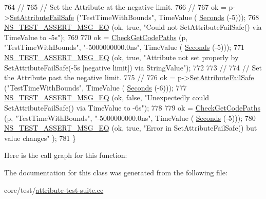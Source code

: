 \begin{DoxyCode}
764   \textcolor{comment}{//}
765   \textcolor{comment}{// Set the Attribute at the negative limit.}
766   \textcolor{comment}{//}
767   ok = p->\hyperlink{classns3_1_1ObjectBase_aa7d333004e970f925a4ed5df275541b5}{SetAttributeFailSafe} (\textcolor{stringliteral}{"TestTimeWithBounds"}, TimeValue (
      \hyperlink{group__timecivil_ga33c34b816f8ff6628e33d5c8e9713b9e}{Seconds} (-5)));
768   \hyperlink{group__testing_ga2a9d78cffb3db8e867c35fff0b698cf5}{NS\_TEST\_ASSERT\_MSG\_EQ} (ok, \textcolor{keyword}{true}, \textcolor{stringliteral}{"Could not SetAttributeFailSafe() via TimeValue to
       -5s"});
769 
770   ok = \hyperlink{classAttributeTestCase_a902fb84c803f1c898329f9263575331e}{CheckGetCodePaths} (p, \textcolor{stringliteral}{"TestTimeWithBounds"}, \textcolor{stringliteral}{"-5000000000.0ns"}, TimeValue (
      \hyperlink{group__timecivil_ga33c34b816f8ff6628e33d5c8e9713b9e}{Seconds} (-5)));
771   \hyperlink{group__testing_ga2a9d78cffb3db8e867c35fff0b698cf5}{NS\_TEST\_ASSERT\_MSG\_EQ} (ok, \textcolor{keyword}{true}, \textcolor{stringliteral}{"Attribute not set properly by
       SetAttributeFailSafe(-5s [negative limit]) via StringValue"});
772 
773   \textcolor{comment}{//}
774   \textcolor{comment}{// Set the Attribute past the negative limit.}
775   \textcolor{comment}{//}
776   ok = p->\hyperlink{classns3_1_1ObjectBase_aa7d333004e970f925a4ed5df275541b5}{SetAttributeFailSafe} (\textcolor{stringliteral}{"TestTimeWithBounds"}, TimeValue (
      \hyperlink{group__timecivil_ga33c34b816f8ff6628e33d5c8e9713b9e}{Seconds} (-6)));
777   \hyperlink{group__testing_ga2a9d78cffb3db8e867c35fff0b698cf5}{NS\_TEST\_ASSERT\_MSG\_EQ} (ok, \textcolor{keyword}{false}, \textcolor{stringliteral}{"Unexpectedly could SetAttributeFailSafe() via
       TimeValue to -6s"});
778 
779   ok = \hyperlink{classAttributeTestCase_a902fb84c803f1c898329f9263575331e}{CheckGetCodePaths} (p, \textcolor{stringliteral}{"TestTimeWithBounds"}, \textcolor{stringliteral}{"-5000000000.0ns"}, TimeValue (
      \hyperlink{group__timecivil_ga33c34b816f8ff6628e33d5c8e9713b9e}{Seconds} (-5)));
780   \hyperlink{group__testing_ga2a9d78cffb3db8e867c35fff0b698cf5}{NS\_TEST\_ASSERT\_MSG\_EQ} (ok, \textcolor{keyword}{true}, \textcolor{stringliteral}{"Error in SetAttributeFailSafe() but value changes"}
      );
781 \}
\end{DoxyCode}


Here is the call graph for this function\+:




The documentation for this class was generated from the following file\+:\begin{DoxyCompactItemize}
\item 
core/test/\hyperlink{attribute-test-suite_8cc}{attribute-\/test-\/suite.\+cc}\end{DoxyCompactItemize}
